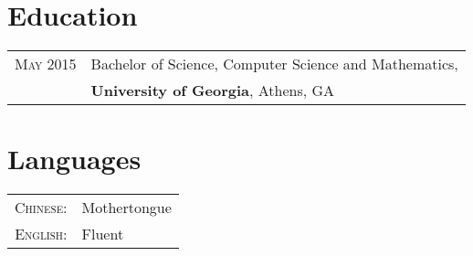 \documentclass[a4paper,10pt]{article}
\begin{document}
\section{Education}
\begin{tabular}{rl}	
 \textsc{May} 2015 & Bachelor of Science, Computer Science and Mathematics, \\ &
 \textbf{University of Georgia}, Athens, GA\\
\end{tabular}

\section{Languages}
\begin{tabular}{rl}
\textsc{Chinese:}&Mothertongue\\
\textsc{English:}&Fluent\\
\end{tabular}
\end{document}
